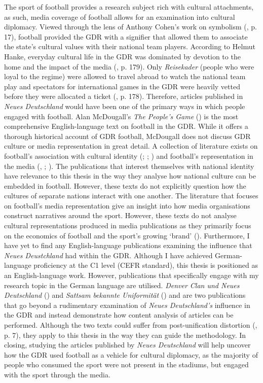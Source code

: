 The sport of football provides a research subject rich with cultural attachments, as such, media coverage of football allows for an examination into cultural diplomacy. Viewed through the lens of Anthony Cohen’s work on symbolism (\citeyear{cohen1995}, p. 17), football provided the GDR with a signifier that allowed them to associate the state’s cultural values with their national team players. According to Helmut Hanke, everyday cultural life in the GDR was dominated by devotion to the home and the impact of the media (\citeyear{hanke1990}, p. 179). Only \textit{Reisekader} (people who were loyal to the regime) were allowed to travel abroad to watch the national team play and spectators for international games in the GDR were heavily vetted before they were allocated a ticket (\cite{mcdougall2014}, p. 178). Therefore, articles published in \textit{Neues Deutschland} would have been one of the primary ways in which people engaged with football. Alan McDougall’s \textit{The People’s Game} (\citeyear{mcdougall2014}) is the most comprehensive English-language text on football in the GDR. While it offers a thorough historical account of GDR football, McDougall does not discuss GDR culture or media representation in great detail. A collection of literature exists on football’s association with cultural identity (\citeyear{archetti1994}; \cite{gibbons2014}; \cite{bocketti2016}) and football’s representation in the media (\cite{boylehaynes2004}, \cite{bridgewater2010}; \cite{miller2011}). The publications that interest themselves with national identity have relevance to this thesis in the way they analyse how national culture can be embedded in football. However, these texts do not explicitly question how the cultures of separate nations interact with one another. The literature that focuses on football’s media representation give an insight into how media organisations construct narratives around the sport. However, these texts do not analyse cultural representations produced in media publications as they primarily focus on the economics of football and the sport’s growing ‘brand’ (\cite{bridgewater2010}). Furthermore, I have yet to find any English-language publications examining the influence that \textit{Neues Deustchland} had within the GDR. Although I have achieved German-language proficiency at the C1 level (CEFR standard), this thesis is positioned as an English-language work. However, publications that specifically engage with my research topic in the German language are utilised. \textit{Denver Clan und Neues Deutschland} (\cite{meyen2003}) and \textit{Sattsam bekannte Uniformität} (\cite{meyenschweiger2008}) and are two publications that go beyond a rudimentary examination of \textit{Neues Deutschland’s} influence in the GDR and instead demonstrate how content analysis of articles can be performed. Although the two texts could suffer from post-unification distortion (\cite{fullbrook1995}, p. 7), they apply to this thesis in the way they can guide the methodology. In closing, studying the articles published by \textit{Neues Deutschland} will help uncover how the GDR used football as a vehicle for cultural diplomacy, as the majority of people who consumed the sport were not present in the stadiums, but engaged with the sport through the media.